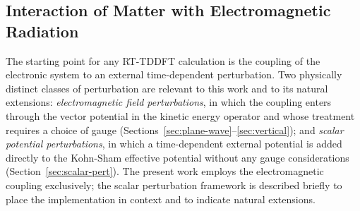 

\subsection{Interaction of Matter with Electromagnetic Radiation}
\label{sec:em-interaction}

The starting point for any RT-TDDFT calculation is the coupling of
the electronic system to an external time-dependent perturbation.
Two physically distinct classes of perturbation are relevant to this
work and to its natural extensions:
\emph{electromagnetic field perturbations}, in which the coupling
enters through the vector potential in the kinetic energy operator
and whose treatment requires a choice of gauge
(Sections~\ref{sec:plane-wave}--\ref{sec:vertical}); and
\emph{scalar potential perturbations}, in which a time-dependent
external potential is added directly to the Kohn-Sham effective
potential without any gauge considerations
(Section~\ref{sec:scalar-pert}).
The present work employs the electromagnetic coupling exclusively;
the scalar perturbation framework is described briefly to place the
implementation in context and to indicate natural extensions.


